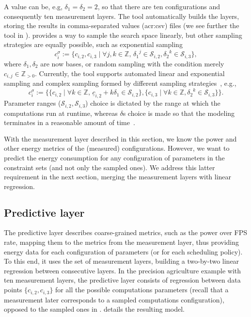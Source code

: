 A value can be, e.g, $\delta_1=\delta_2=2$, so that there are ten configurations and consequently ten measurement layers. The \powprof{} tool automatically builds the layers, storing the results in comma-separated values (\Gls{acr:csv}) files (we see further the tool in ).
 provides a way to sample the search space linearly, but other sampling strategies are equally possible, such as exponential sampling
\begin{equation}\label{eq:meas-layer-exp-sampl}
  c_{i}^\sigma:=\{c_{i,2},c_{i,3}\mid\forall j,k\in\mathbb{Z},\, {\delta_1}^j\in\mathcal{S}_{i,2},{\delta_2}^k\in\mathcal{S}_{i,3}\},
\end{equation}
where $\delta_1,\delta_2$ are now bases, or random sampling with the condition merely $c_{i,j}\in\mathbb{Z}_{>0}$. Currently, the \powprof{} tool supports automated linear and exponential sampling and complex sampling formed by different sampling strategies~\citep{seewald2019coarse}, e.g.,
\begin{equation}
  c_{i}^\sigma:=\{\{c_{i,2}\mid\forall k\in\mathbb{Z},\, \underline{c}_{i,2}+k\delta_1\in\mathcal{S}_{i,2}\},\{c_{i,3}\mid\forall k\in\mathbb{Z},{\delta_2}^k\in\mathcal{S}_{i,3}\}\}.
\end{equation}
Parameter ranges ($\mathcal{S}_{i,2},\mathcal{S}_{i,3}$) choice is dictated by the range at which the computations run at runtime, whereas $\delta$s choice is made so that the modeling terminates in a reasonable amount of time~\citep{seewald2019coarse}.

With the measurement layer described in this section, we know the power and other energy metrics of the (measured) configurations. However, we want to predict the energy consumption for any configuration of parameters in the constraint sets (and not only the sampled ones). We address this latter requirement in the next section, merging the measurement layers with linear regression.

\subsection{Predictive layer}
\label{sec:predictive-layer}

The predictive layer describes coarse-grained metrics, such as the power over FPS rate, mapping them to the metrics from the measurement layer, thus providing energy data for each configuration of parameters (or for each scheduling policy). To this end, it uses the set of measurement layers, building a two-by-two linear regression between consecutive layers. In the precision agriculture example with ten measurement layers, the predictive layer consists of regression between data points $\{c_{i,2},c_{i,3}\}$ for all the possible computations parameters (recall that a measurement later corresponds to a sampled computations configuration), opposed to the sampled ones in .  details the resulting model.

